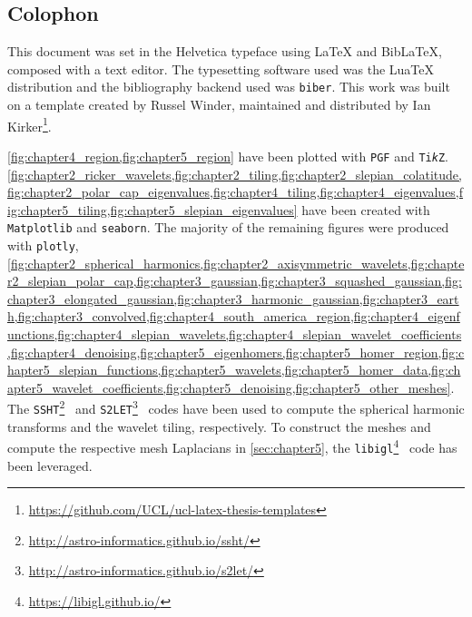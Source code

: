 \begin{appendices}

\chapter{Colophon}\label{sec:appendix}

This document was set in the Helvetica typeface using \LaTeX{} and Bib\LaTeX{}, composed with a text editor.
The typesetting software used was the Lua\TeX{} distribution and the bibliography backend used was \texttt{biber}.
This work was built on a template created by Russel Winder, maintained and distributed by Ian Kirker\footnote{\url{https://github.com/UCL/ucl-latex-thesis-templates}}.

\cref{fig:chapter4_region,fig:chapter5_region} have been plotted with \texttt{PGF} and \texttt{Ti\emph{k}Z}.
\cref{fig:chapter2_ricker_wavelets,fig:chapter2_tiling,fig:chapter2_slepian_colatitude,fig:chapter2_polar_cap_eigenvalues,fig:chapter4_tiling,fig:chapter4_eigenvalues,fig:chapter5_tiling,fig:chapter5_slepian_eigenvalues} have been created with \texttt{Matplotlib} and \texttt{seaborn}.
The majority of the remaining figures were produced with \texttt{plotly}, \ie{} \cref{fig:chapter2_spherical_harmonics,fig:chapter2_axisymmetric_wavelets,fig:chapter2_slepian_polar_cap,fig:chapter3_gaussian,fig:chapter3_squashed_gaussian,fig:chapter3_elongated_gaussian,fig:chapter3_harmonic_gaussian,fig:chapter3_earth,fig:chapter3_convolved,fig:chapter4_south_america_region,fig:chapter4_eigenfunctions,fig:chapter4_slepian_wavelets,fig:chapter4_slepian_wavelet_coefficients,fig:chapter4_denoising,fig:chapter5_eigenhomers,fig:chapter5_homer_region,fig:chapter5_slepian_functions,fig:chapter5_wavelets,fig:chapter5_homer_data,fig:chapter5_wavelet_coefficients,fig:chapter5_denoising,fig:chapter5_other_meshes}.
The \texttt{SSHT}\footnote{\url{http://astro-informatics.github.io/ssht/}}~\cite{McEwen2011} and \texttt{S2LET}\footnote{\url{http://astro-informatics.github.io/s2let/}}~\cite{Leistedt2013} codes have been used to compute the spherical harmonic transforms and the wavelet tiling, respectively.
To construct the meshes and compute the respective mesh Laplacians in \cref{sec:chapter5}, the \texttt{libigl}\footnote{\url{https://libigl.github.io/}}~\cite{Libigl2017} code has been leveraged.



\end{appendices}
